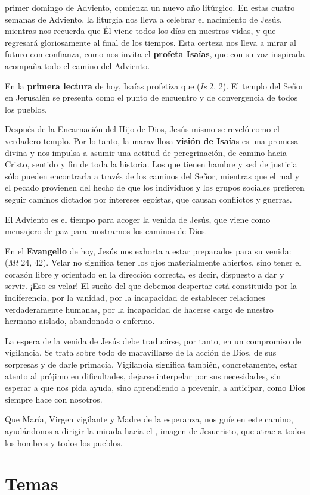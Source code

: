 \begin{body}
	 primer domingo de Adviento, comienza un nuevo año litúrgico. En estas cuatro semanas de Adviento, la liturgia nos lleva a celebrar el nacimiento de Jesús, mientras nos recuerda que Él viene todos los días en nuestras vidas, y que regresará gloriosamente al final de los tiempos. Esta certeza nos lleva a mirar al futuro con confianza, como nos invita el \textbf{profeta Isaías}, que con su voz inspirada acompaña todo el camino del Adviento. 
	
	En la \textbf{primera lectura} de hoy, Isaías profetiza que  (\emph{Is} 2, 2). El templo del Señor en Jerusalén se presenta como el punto de encuentro y de convergencia de todos los pueblos. 
	
	Después de la Encarnación del Hijo de Dios, Jesús mismo se reveló como el verdadero templo. Por lo tanto, la maravillosa \textbf{visión de Isaía}s es una promesa divina y nos impulsa a asumir una actitud de peregrinación, de camino hacia Cristo, sentido y fin de toda la historia. Los que tienen hambre y sed de justicia sólo pueden encontrarla a través de los caminos del Señor, mientras que el mal y el pecado provienen del hecho de que los individuos y los grupos sociales prefieren seguir caminos dictados por intereses egoístas, que causan conflictos y guerras. 
	
	El Adviento es el tiempo para acoger la venida de Jesús, que viene como mensajero de paz para mostrarnos los caminos de Dios. 
	
	En el \textbf{Evangelio} de hoy, Jesús nos exhorta a estar preparados para su venida:  (\emph{Mt} 24, 42). Velar no significa tener los ojos materialmente abiertos, sino tener el corazón libre y orientado en la dirección correcta, es decir, dispuesto a dar y servir. ¡Eso es velar! El sueño del que debemos despertar está constituido por la indiferencia, por la vanidad, por la incapacidad de establecer relaciones verdaderamente humanas, por la incapacidad de hacerse cargo de nuestro hermano aislado, abandonado o enfermo. 
	
	La espera de la venida de Jesús debe traducirse, por tanto, en un compromiso de vigilancia. Se trata sobre todo de maravillarse de la acción de Dios, de sus sorpresas y de darle primacía. Vigilancia significa también, concretamente, estar atento al prójimo en dificultades, dejarse interpelar por sus necesidades, sin esperar a que nos pida ayuda, sino aprendiendo a prevenir, a anticipar, como Dios siempre hace con nosotros. 
	
	Que María, Virgen vigilante y Madre de la esperanza, nos guíe en este camino, ayudándonos a dirigir la mirada hacia el , imagen de Jesucristo, que atrae a todos los hombres y todos los pueblos.
\end{body}

\newsection
\section{Temas}

